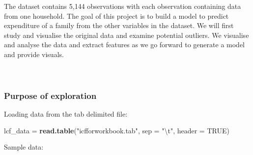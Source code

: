 \documentclass[]{article}
\newenvironment{Shaded}{\begin{snugshade}}{\end{snugshade}}
\newcommand{\CharTok}[1]{\textcolor[rgb]{0.31,0.60,0.02}{#1}}
\newcommand{\DataTypeTok}[1]{\textcolor[rgb]{0.13,0.29,0.53}{#1}}
\newcommand{\KeywordTok}[1]{\textcolor[rgb]{0.13,0.29,0.53}{\textbf{#1}}}
\newcommand{\NormalTok}[1]{#1}
\newcommand{\OperatorTok}[1]{\textcolor[rgb]{0.81,0.36,0.00}{\textbf{#1}}}
\newcommand{\OtherTok}[1]{\textcolor[rgb]{0.56,0.35,0.01}{#1}}
\newcommand{\StringTok}[1]{\textcolor[rgb]{0.31,0.60,0.02}{#1}}
\begin{document}
The dataset contains 5,144 observations with each observation containing
data from one household. The goal of this project is to build a model to
predict expenditure of a family from the other variables in the dataset.
We will first study and visualise the original data and examine
potential outliers. We visualise and analyse the data and extract
features as we go forward to generate a model and provide visuals.\\
~\\
~\\

\hypertarget{purpose-of-exploration}{%
\subsubsection{Purpose of exploration}\label{purpose-of-exploration}}

Loading data from the tab delimited file:

\begin{Shaded}
\begin{Highlighting}[]
\NormalTok{lcf_data =}\StringTok{ }\KeywordTok{read.table}\NormalTok{(}\StringTok{"icfforworkbook.tab"}\NormalTok{, }\DataTypeTok{sep =} \StringTok{"}\CharTok{\textbackslash{}t}\StringTok{"}\NormalTok{, }\DataTypeTok{header =} \OtherTok{TRUE}\NormalTok{)}
\end{Highlighting}
\end{Shaded}

Sample data:

\begin{Shaded}
\end{Shaded}
\end{document}
